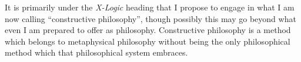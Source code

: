 \documentclass[numreferences]{rbjk}
\begin{document}
\begin{article}
It is primarily under the {\it X-Logic} heading that I propose to engage in what I am now calling ``constructive philosophy'', though possibly this may go beyond what even I am prepared to offer as philosophy.
Constructive philosophy is a method which belongs to metaphysical philosophy without being the only philosophical method which that philosophical system embraces.



%

{\raggedright


} %


\end{article}
\end{document}
